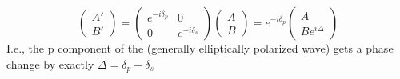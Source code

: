 \documentclass[../electromagnetism.tex]{subfiles}
\begin{document}
\begin{equation}
	\begin{pmatrix}
		A'\\B'
	\end{pmatrix}=\begin{pmatrix}
		e^{-i\delta_p}&0\\
		0&e^{-i\delta_s}
	\end{pmatrix}\begin{pmatrix}
		A\\B
	\end{pmatrix}=e^{-i\delta_p}\begin{pmatrix}
		A\\Be^{i\Delta}
	\end{pmatrix}
	\label{eq:phasechangeinTIRcalc}
\end{equation}
I.e., the p component of the (generally elliptically polarized wave) gets a phase change by exactly $\Delta=\delta_p-\delta_s$
\end{document}
